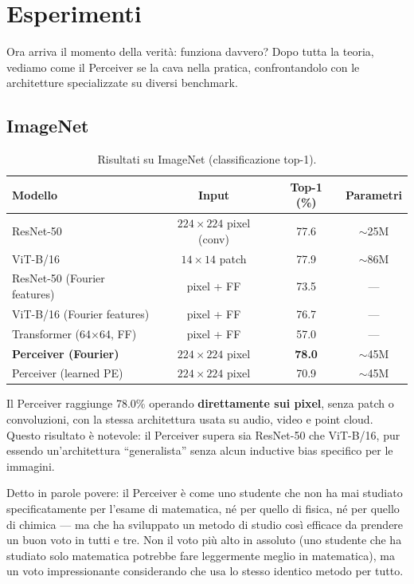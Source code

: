 \documentclass[12pt,a4paper]{article}
\begin{document}
\newpage
\section{Esperimenti} \label{sec:esperimenti}

Ora arriva il momento della verit\`a: funziona davvero? Dopo tutta la teoria, vediamo come il Perceiver se la cava nella pratica, confrontandolo con le architetture specializzate su diversi benchmark.

\subsection{ImageNet} \label{sec:imagenet}

\begin{table}[htbp]
\centering
\caption{Risultati su ImageNet (classificazione top-1).}
\begin{tabular}{@{}lccc@{}}
\toprule
\textbf{Modello} & \textbf{Input} & \textbf{Top-1 (\%)} & \textbf{Parametri} \\
\midrule
ResNet-50 & $224 \times 224$ pixel (conv) & 77.6 & $\sim$25M \\
ViT-B/16 & $14 \times 14$ patch & 77.9 & $\sim$86M \\
ResNet-50 (Fourier features) & pixel + FF & 73.5 & --- \\
ViT-B/16 (Fourier features) & pixel + FF & 76.7 & --- \\
Transformer (64$\times$64, FF) & pixel + FF & 57.0 & --- \\
\textbf{Perceiver (Fourier)} & $224 \times 224$ pixel & \textbf{78.0} & $\sim$45M \\
Perceiver (learned PE) & $224 \times 224$ pixel & 70.9 & $\sim$45M \\
\bottomrule
\end{tabular}
\end{table}

Il Perceiver raggiunge 78.0\% operando \textbf{direttamente sui pixel}, senza patch o convoluzioni, con la stessa architettura usata su audio, video e point cloud. Questo risultato \`e notevole: il Perceiver supera sia ResNet-50 che ViT-B/16, pur essendo un'architettura ``generalista'' senza alcun inductive bias specifico per le immagini.

\begin{notabox}
Detto in parole povere: il Perceiver \`e come uno studente che non ha mai studiato specificatamente per l'esame di matematica, n\'e per quello di fisica, n\'e per quello di chimica --- ma che ha sviluppato un metodo di studio cos\`i efficace da prendere un buon voto in tutti e tre. Non il voto pi\`u alto in assoluto (uno studente che ha studiato solo matematica potrebbe fare leggermente meglio in matematica), ma un voto impressionante considerando che usa lo stesso identico metodo per tutto.
\end{notabox}
\end{document}
